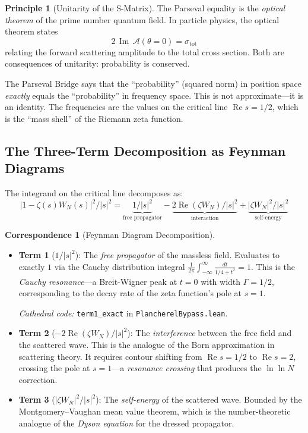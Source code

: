 \documentclass[11pt,a4paper]{article}
\theoremstyle{definition}
\newtheorem{principle}[definition]{Principle}
\newtheorem{correspondence}[definition]{Correspondence}
\newcommand{\re}{\operatorname{Re}}
\newcommand{\im}{\operatorname{Im}}
\newcommand{\lean}[1]{\texttt{#1}}
\begin{document}
\begin{principle}[Unitarity of the S-Matrix]
The Parseval equality is the \emph{optical theorem} of the prime number
quantum field. In particle physics, the optical theorem states
\[
  2\,\im\,\mathcal{A}(\theta=0) = \sigma_{\mathrm{tot}}
\]
relating the forward scattering amplitude to the total cross section.
Both are consequences of unitarity: probability is conserved.

The Parseval Bridge says that the ``probability'' (squared norm) in
position space \emph{exactly} equals the ``probability'' in frequency
space. This is not approximate---it is an identity. The frequencies
are the values on the critical line $\re s = 1/2$, which is the
``mass shell'' of the Riemann zeta function.
\end{principle}

\subsection{The Three-Term Decomposition as Feynman Diagrams}

The integrand on the critical line decomposes as:
\[
  |1 - \zeta(s)W_N(s)|^2 / |s|^2
  = \underbrace{1/|s|^2}_{\text{free propagator}}
  - \underbrace{2\re(\zeta W_N)/|s|^2}_{\text{interaction}}
  + \underbrace{|\zeta W_N|^2/|s|^2}_{\text{self-energy}}
\]

\begin{correspondence}[Feynman Diagram Decomposition]
\begin{itemize}
  \item \textbf{Term 1} ($1/|s|^2$): The \emph{free propagator} of the
    massless field. Evaluates to exactly $1$ via the Cauchy distribution
    integral $\frac{1}{2\pi}\int_{-\infty}^\infty \frac{dt}{1/4+t^2} = 1$.
    This is the \emph{Cauchy resonance}---a Breit-Wigner peak at $t=0$
    with width $\Gamma = 1/2$, corresponding to the decay rate of
    the zeta function's pole at $s=1$.

    \emph{Cathedral code:} \lean{term1\_exact} in \lean{PlancherelBypass.lean}.

  \item \textbf{Term 2} ($-2\re(\zeta W_N)/|s|^2$): The \emph{interference}
    between the free field and the scattered wave. This is the analogue of
    the Born approximation in scattering theory. It requires contour shifting
    from $\re s = 1/2$ to $\re s = 2$, crossing the pole at $s=1$---a
    \emph{resonance crossing} that produces the $\ln\ln N$ correction.

  \item \textbf{Term 3} ($|\zeta W_N|^2/|s|^2$): The \emph{self-energy}
    of the scattered wave. Bounded by the Montgomery--Vaughan mean value
    theorem, which is the number-theoretic analogue of the \emph{Dyson
    equation} for the dressed propagator.
\end{itemize}
\end{correspondence}
\end{document}
